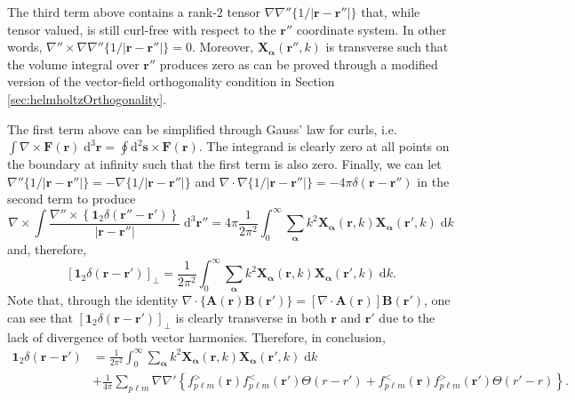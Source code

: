 \documentclass{article}
\begin{document}
The third term above contains a rank-2 tensor $\nabla\nabla''\{1/|\mathbf{r} - \mathbf{r}''|\}$ that, while tensor valued, is still curl-free with respect to the $\mathbf{r}''$ coordinate system. In other words, $\nabla''\times\nabla\nabla''\{1/|\mathbf{r} - \mathbf{r}''|\} = 0$. Moreover, $\mathbf{X}_{\bm{\alpha}}(\mathbf{r}'',k)$ is transverse such that the volume integral over $\mathbf{r}''$ produces zero as can be proved through a modified version of the vector-field orthogonality condition in Section \ref{sec:helmholtzOrthogonality}.

The first term above can be simplified through Gauss' law for curls, i.e. $\int\nabla\times\mathbf{F}(\mathbf{r})\;\mathrm{d}^3\mathbf{r} = \oint\mathrm{d}^2\mathbf{s}\times\mathbf{F}(\mathbf{r})$. The integrand is clearly zero at all points on the boundary at infinity such that the first term is also zero. Finally, we can let $\nabla''\{1/|\mathbf{r} - \mathbf{r}''|\} = -\nabla\{1/|\mathbf{r} - \mathbf{r}''|\}$ and $\nabla\cdot\nabla\{1/|\mathbf{r} - \mathbf{r}''|\} = -4\pi\delta(\mathbf{r} - \mathbf{r}'')$ in the second term to produce
\begin{equation}
\nabla\times\int\frac{\nabla''\times\left\{\bm{1}_2\delta(\mathbf{r}'' - \mathbf{r}')\right\}}{|\mathbf{r} - \mathbf{r}''|}\;\mathrm{d}^3\mathbf{r}'' = 4\pi\frac{1}{2\pi^2}\int_0^\infty\sum_{\bm{\alpha}}k^2\mathbf{X}_{\bm{\alpha}}(\mathbf{r},k)\mathbf{X}_{\bm{\alpha}}(\mathbf{r}',k)\;\mathrm{d}k
\end{equation}
and, therefore,
\begin{equation}
\left[\bm{1}_2\delta(\mathbf{r} - \mathbf{r}')\right]_\perp = \frac{1}{2\pi^2}\int_0^\infty\sum_{\bm{\alpha}}k^2\mathbf{X}_{\bm{\alpha}}(\mathbf{r},k)\mathbf{X}_{\bm{\alpha}}(\mathbf{r}',k)\;\mathrm{d}k.
\end{equation}
Note that, through the identity $\nabla\cdot\{\mathbf{A}(\mathbf{r})\mathbf{B}(\mathbf{r}')\} = [\nabla\cdot\mathbf{A}(\mathbf{r})]\mathbf{B}(\mathbf{r}')$, one can see that $\left[\bm{1}_2\delta(\mathbf{r} - \mathbf{r}')\right]_\perp$ is clearly transverse in both $\mathbf{r}$ and $\mathbf{r}'$ due to the lack of divergence of both vector harmonics. Therefore, in conclusion,
\begin{equation}
\begin{split}
\bm{1}_2\delta(\mathbf{r} - \mathbf{r}') &= \frac{1}{2\pi^2}\int_0^\infty\sum_{\bm{\alpha}}k^2\mathbf{X}_{\bm{\alpha}}(\mathbf{r},k)\mathbf{X}_{\bm{\alpha}}(\mathbf{r}',k)\;\mathrm{d}k\\
&+ \frac{1}{4\pi}\sum_{p\ell m}\nabla\nabla'\left\{ f_{p\ell m}^>(\mathbf{r})f_{p\ell m}^<(\mathbf{r}')\Theta(r - r') +  f_{p\ell m}^<(\mathbf{r})f_{p\ell m}^>(\mathbf{r}')\Theta(r' - r)\right\}.
\end{split}
\end{equation}
\end{document}
